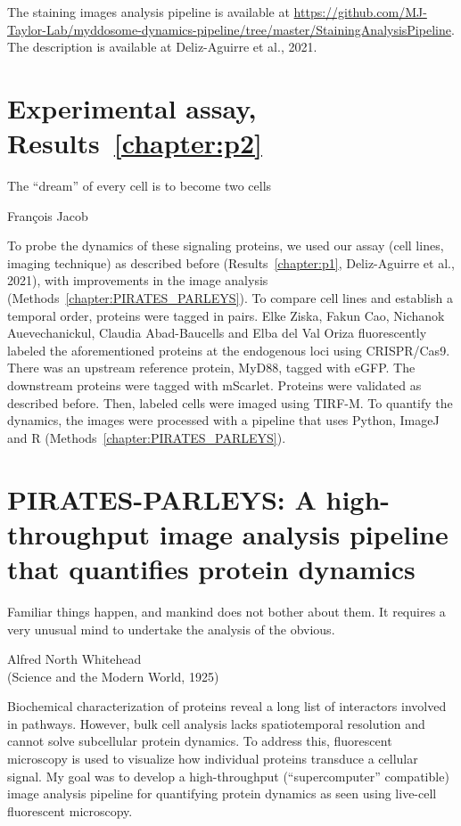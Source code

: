 The staining images analysis pipeline is available at \url{https://github.com/MJ-Taylor-Lab/myddosome-dynamics-pipeline/tree/master/StainingAnalysisPipeline}. The description is available at Deliz-Aguirre et al., 2021.

\chapter{Experimental assay, Results~\ref{chapter:p2}}
\label{chapter:assay_v2}
\epigraph{The “dream” of every cell is to become two cells}{François Jacob}

To probe the dynamics of these signaling proteins, we used our assay (cell lines, imaging technique) as described before (Results~\ref{chapter:p1}, Deliz-Aguirre et al., 2021), with improvements in the image analysis (Methods~\ref{chapter:PIRATES_PARLEYS}). To compare cell lines and establish a temporal order, proteins were tagged in pairs. Elke Ziska, Fakun Cao, Nichanok Auevechanickul, Claudia Abad-Baucells and Elba del Val Oriza fluorescently labeled the aforementioned proteins at the endogenous loci using CRISPR/Cas9. There was an upstream reference protein, MyD88, tagged with eGFP. The downstream proteins were tagged with mScarlet. Proteins were validated as described before. Then, labeled cells were imaged using TIRF-M. To quantify the dynamics, the images were processed with a pipeline that uses Python, ImageJ and R (Methods~\ref{chapter:PIRATES_PARLEYS}).

\chapter{PIRATES-PARLEYS: A high-throughput image analysis pipeline that quantifies protein dynamics}
\label{chapter:PIRATES_PARLEYS}
\epigraph{Familiar things happen, and mankind does not bother about them. It requires a very unusual mind to undertake the analysis of the obvious.}{Alfred North Whitehead\\(Science and the Modern World, 1925)}

Biochemical characterization of proteins reveal a long list of interactors involved in pathways. However, bulk cell analysis lacks spatiotemporal resolution and cannot solve subcellular protein dynamics. To address this, fluorescent microscopy is used to visualize how individual proteins transduce a cellular signal. My goal was to develop a high-throughput (“supercomputer” compatible) image analysis pipeline for quantifying protein dynamics as seen using live-cell fluorescent microscopy.

